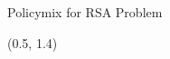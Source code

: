 \documentclass[english,aspectratio=169,dvipsnames]{beamer}
\begin{document}
%             

\begin{frame}{Policymix for RSA Problem}
	\begin{textblock}{5}(0.5, 1.4)
        
    \end{textblock}
\end{frame}


\end{document}
